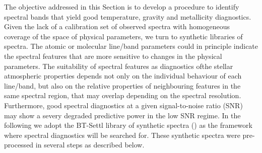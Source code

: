 

{ The objective addressed in this Section is to develop a procedure to
  identify spectral bands that yield good temperature, gravity and
  metallicity diagnostics. Given the lack of a calibration set of
  observed spectra with homogeneous coverage of the space of physical
  parameters, we turn to synthetic libraries of spectra. The atomic or
  molecular line/band parameters could in principle indicate the
  spectral features that are more sensitive to changes in the physical
  parameters. The suitability of spectral features as diagnostics
  ofthe stellar atmospheric properties depends not only on the
  individual behaviour of each line/band, but also on the relative
  properties of neighbouring features in the same spectral region,
  that may overlap depending on the spectral resolution. Furthermore,
  good spectral diagnostics at a given signal-to-noise ratio (SNR) may
  show a severy degraded predictive power in the low SNR regime. In
  the following we adopt the BT-Settl library of synthetic spectra
  (\cite{2013MSAIS..24..128A}) as the framework where spectral
  diagnostics will be searched for. These synthetic spectra were
  pre-processed in several steps as described below.}

